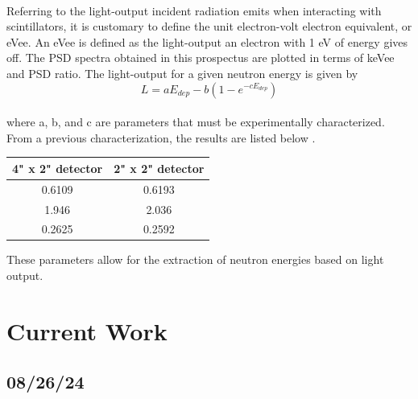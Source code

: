 \documentclass[11pt,copyright]{fsuthesis}
\begin{document}
\\
Referring to the light-output incident radiation emits when interacting with scintillators, it is customary to define the unit electron-volt electron equivalent, or eVee. An eVee is defined as the light-output an electron with 1 eV of energy gives off. The PSD spectra obtained in this prospectus are plotted in terms of keVee and PSD ratio. The light-output for a given neutron energy is given by \cite{LAWRENCE201321} \\ \[L=aE_{dep}-b(1-e^{-cE_{dep}})\] \\ where a, b, and c are parameters that must be experimentally characterized. From a previous characterization, the results are listed below \cite{morelock2022characterization}. 

\begin{centering}
\begin{tabular}{|c|c|}
  \hline
  4" x 2" detector & 2" x 2" detector \\
  \hline
  0.6109 & 0.6193 \\
  1.946  & 2.036  \\
  0.2625 & 0.2592 \\
  \hline
\end{tabular}
\end{centering}

These parameters allow for the extraction of neutron energies based on light output.

\chapter{Current Work}
\section{08/26/24}
\end{document}
